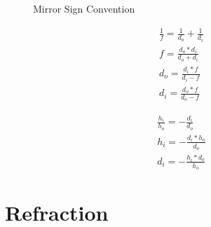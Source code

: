 \documentclass{article}
\begin{document}
\begin{figure}[ht]
    \centering
    \caption{Mirror Sign Convention}
    \label{fig:mirror_sign}
\end{figure}

\begin{figure}[ht]
    \begin{minipage}[b]{0.5\linewidth}
        \begin{gather}
            \frac{1}{f} = \frac{1}{d_o} + \frac{1}{d_i} \\
            f = \frac{d_o*d_i}{d_o + d_i} \\
            d_o = \frac{d_i*f}{d_i - f} \\
            d_i = \frac{d_o*f}{d_o - f}
        \end{gather}
        \label{fig:mirror_eq}
    \end{minipage}
    \begin{minipage}[b]{0.5\linewidth}
        \begin{gather}
            \frac{h_i}{h_o} = -\frac{d_i}{d_o} \\
            h_i = -\frac{d_i*h_o}{d_o} \\
            d_i = -\frac{h_i*d_o}{h_o}
        \end{gather}
        \label{fig:mag_eq}
    \end{minipage}
\end{figure}

\section{Refraction}
\end{document}
